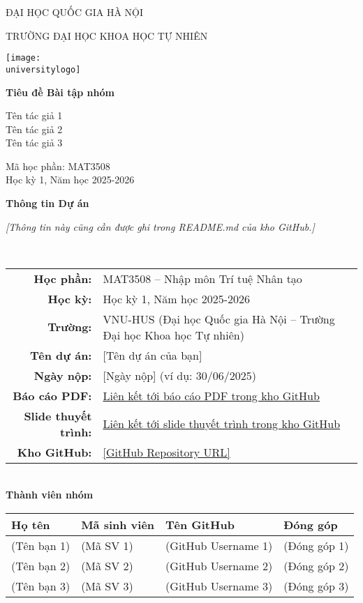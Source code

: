 \documentclass[a4paper]{book}
\newcommand{\reporttitle}{Tiêu đề Bài tập nhóm}
\newcommand{\reportauthors}{%
    Tên tác giả 1\\
    Tên tác giả 2\\
    Tên tác giả 3
}
\newcommand{\courseinfo}{Mã học phần: MAT3508\\ Học kỳ 1, Năm học 2025-2026}
\newcommand{\universitylogo}{HUS.png} %
\begin{document}
\begin{titlepage}
    \centering
    \vspace*{-1cm}
    {\LARGE\MakeUppercase{Đại học Quốc gia Hà Nội}\par}
    {\LARGE\MakeUppercase{Trường Đại học Khoa học Tự nhiên}\par}
    \vfill
    \texttt{[image: \\universitylogo]}\par\vfill
    {\Huge \bfseries \reporttitle \par}
    \vspace{1cm}
    {\Large \reportauthors \par}
    \vspace{1cm}
    {\large \courseinfo \par}
    \vfill
\end{titlepage}

\clearpage
\thispagestyle{empty}
\begin{center}
    {\LARGE \textbf{Thông tin Dự án}}\\[1.5em]
    \parbox{0.85\textwidth}{
        \textit{[Thông tin này cũng cần được ghi trong README.md của kho GitHub.]}
    }
    \\[2em]
    \begin{tabular}{rl}
        \textbf{Học phần:} & MAT3508 -- Nhập môn Trí tuệ Nhân tạo \\
        \textbf{Học kỳ:} & Học kỳ 1, Năm học 2025-2026 \\
        \textbf{Trường:} & VNU-HUS (Đại học Quốc gia Hà Nội -- Trường Đại học Khoa học Tự nhiên) \\
        \textbf{Tên dự án:} & {[Tên dự án của bạn]} \\
        \textbf{Ngày nộp:} & {[Ngày nộp]} (ví dụ: 30/06/2025) \\
        \textbf{Báo cáo PDF:} & \href{[PDF Link]}{Liên kết tới báo cáo PDF trong kho GitHub} \\
        \textbf{Slide thuyết trình:} & \href{[Slides Link]}{Liên kết tới slide thuyết trình trong kho GitHub} \\
        \textbf{Kho GitHub:} & \url{[GitHub Repository URL]}
    \end{tabular}
    \\[2em]
    {\Large \textbf{Thành viên nhóm}}\\[1em]
    \begin{tabular}{|l|l|l|l|}
        \hline
        \textbf{Họ tên} & \textbf{Mã sinh viên} & \textbf{Tên GitHub} & \textbf{Đóng góp} \\
        \hline
        (Tên bạn 1) & (Mã SV 1) & (GitHub Username 1) & (Đóng góp 1) \\
        \hline
        (Tên bạn 2) & (Mã SV 2) & (GitHub Username 2) & (Đóng góp 2) \\
        \hline
        (Tên bạn 3) & (Mã SV 3) & (GitHub Username 3) & (Đóng góp 3) \\
        \hline
    \end{tabular}
\end{center}
\clearpage
\end{document}
